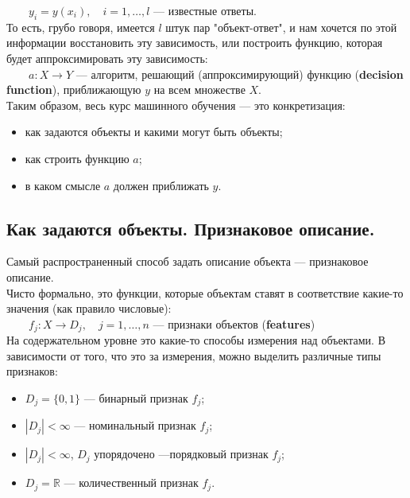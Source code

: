 \documentclass{article}
\begin{document}
$\qquad y_i = y(x_i),\quad i = 1, \ldots,l$ --- известные ответы.
\\

То есть, грубо говоря, имеется $l$ штук пар "объект-ответ", и нам хочется по этой информации восстановить эту зависимость, или построить функцию, которая будет аппроксимировать эту зависимость:
\\

$\qquad a: X \rightarrow Y$ --- алгоритм, решающий (аппроксимирующий) функцию (\textbf{decision function}),
приближающую $y$ на всем множестве $X$.
\\

\newpage
Таким образом, весь курс машинного обучения --- это конкретизация:

\begin{itemize}
\item как задаются объекты и какими могут быть объекты;
\item как строить функцию $a$;
\item в каком смысле $a$ должен приближать $y$.
\end{itemize}

\subsection{Как задаются объекты. Признаковое описание.}

Самый распространенный способ задать описание объекта --- признаковое описание.
\\

Чисто формально, это функции, которые объектам ставят в соответствие какие-то значения (как правило числовые):
\\

$\qquad f_j: X \rightarrow D_j,\quad j = 1, \ldots, n$
--- признаки объектов (\textbf{features})
\\

На содержательном уровне это какие-то способы измерения над объектами. В зависимости от того, что это за измерения, можно выделить различные типы признаков:

\begin{itemize}
\item $D_j = \{0, 1\}$ --- бинарный признак $f_j$;

\item $|D_j| < \infty$ --- номинальный признак $f_j$;

\item $|D_j| < \infty$,   $D_j$ упорядочено ---порядковый признак $f_j$;

\item $D_j = \mathbb{R}$ --- количественный признак $f_j$.
\end{itemize}
\end{document}
